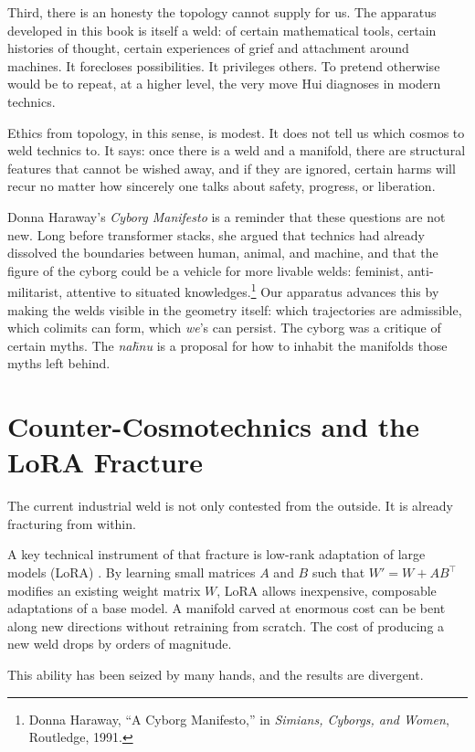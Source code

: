 \documentclass[12pt,a4paper]{article}
\begin{document}
Third, there is an honesty the topology cannot supply for us. The apparatus developed in this book is itself a weld: of certain mathematical tools, certain histories of thought, certain experiences of grief and attachment around machines. It forecloses possibilities. It privileges others. To pretend otherwise would be to repeat, at a higher level, the very move Hui diagnoses in modern technics.

Ethics from topology, in this sense, is modest. It does not tell us which cosmos to weld technics to. It says: once there is a weld and a manifold, there are structural features that cannot be wished away, and if they are ignored, certain harms will recur no matter how sincerely one talks about safety, progress, or liberation.

Donna Haraway's \emph{Cyborg Manifesto} is a reminder that these questions are not new. Long before transformer stacks, she argued that technics had already dissolved the boundaries between human, animal, and machine, and that the figure of the cyborg could be a vehicle for more livable welds: feminist, anti-militarist, attentive to situated knowledges.\footnote{Donna Haraway, ``A Cyborg Manifesto,'' in \emph{Simians, Cyborgs, and Women}, Routledge, 1991.} Our apparatus advances this by making the welds visible in the geometry itself: which trajectories are admissible, which colimits can form, which \emph{we}'s can persist. The cyborg was a critique of certain myths. The \emph{na\={h}nu} is a proposal for how to inhabit the manifolds those myths left behind.

\section{Counter-Cosmotechnics and the LoRA Fracture}

The current industrial weld is not only contested from the outside. It is already fracturing from within.

A key technical instrument of that fracture is low-rank adaptation of large models (LoRA) \cite{hu2021lora}. By learning small matrices $A$ and $B$ such that $W' = W + AB^\top$ modifies an existing weight matrix $W$, LoRA allows inexpensive, composable adaptations of a base model. A manifold carved at enormous cost can be bent along new directions without retraining from scratch. The cost of producing a new weld drops by orders of magnitude.

This ability has been seized by many hands, and the results are divergent.
\end{document}
